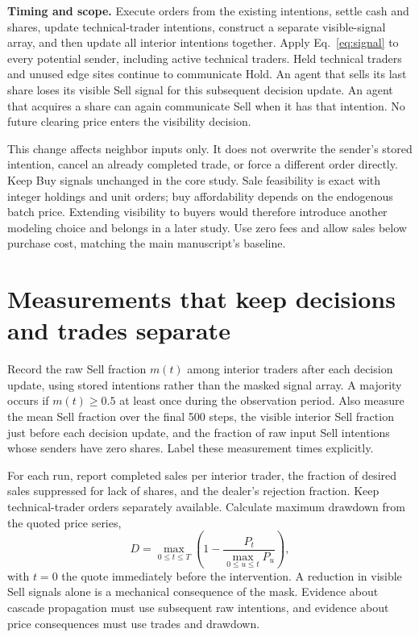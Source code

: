 \documentclass[11pt,letterpaper]{article}
\newcommand{\lead}[1]{\textbf{\textcolor{ink}{#1}}}
\begin{document}
\lead{Timing and scope.} Execute orders from the existing intentions, settle cash and shares, update technical-trader intentions, construct a separate visible-signal array, and then update all interior intentions together. Apply Eq.~\eqref{eq:signal} to every potential sender, including active technical traders. Held technical traders and unused edge sites continue to communicate Hold. An agent that sells its last share loses its visible Sell signal for this subsequent decision update. An agent that acquires a share can again communicate Sell when it has that intention. No future clearing price enters the visibility decision.

This change affects neighbor inputs only. It does not overwrite the sender's stored intention, cancel an already completed trade, or force a different order directly. Keep Buy signals unchanged in the core study. Sale feasibility is exact with integer holdings and unit orders; buy affordability depends on the endogenous batch price. Extending visibility to buyers would therefore introduce another modeling choice and belongs in a later study. Use zero fees and allow sales below purchase cost, matching the main manuscript's baseline.

\section{Measurements that keep decisions and trades separate}
Record the raw Sell fraction $m(t)$ among interior traders after each decision update, using stored intentions rather than the masked signal array. A majority occurs if $m(t)\geq0.5$ at least once during the observation period. Also measure the mean Sell fraction over the final 500 steps, the visible interior Sell fraction just before each decision update, and the fraction of raw input Sell intentions whose senders have zero shares. Label these measurement times explicitly.

For each run, report completed sales per interior trader, the fraction of desired sales suppressed for lack of shares, and the dealer's rejection fraction. Keep technical-trader orders separately available. Calculate maximum drawdown from the quoted price series,
\begin{equation}
 D=\max_{0\leq t\leq T}\left(1-\frac{P_t}{\max_{0\leq u\leq t}P_u}\right),
\end{equation}
with $t=0$ the quote immediately before the intervention. A reduction in visible Sell signals alone is a mechanical consequence of the mask. Evidence about cascade propagation must use subsequent raw intentions, and evidence about price consequences must use trades and drawdown.
\end{document}
